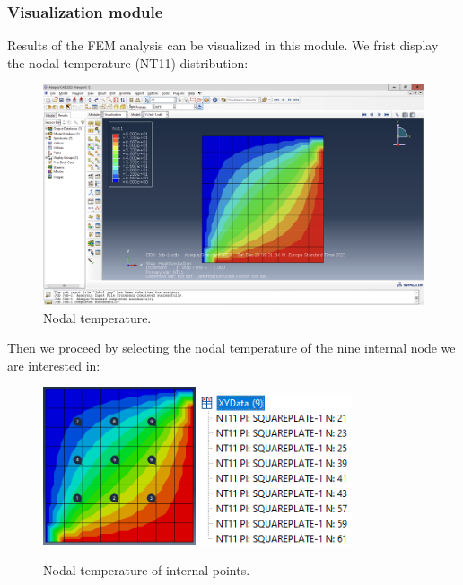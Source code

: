 \newpage

\subsubsection{Visualization module}

Results of the FEM analysis can be visualized in this module. We frist display the nodal temperature (NT11) distribution:
\begin{figure}[H]
    \centering
    \includegraphics[width=\textwidth]{Images/ab2/ab16.png}
    \caption{Nodal temperature.}
    \label{fig:ab16}
\end{figure}

Then we proceed by selecting the nodal temperature of the nine internal node we are interested in:

\begin{figure}[H]
    \centering
    \includegraphics[width=0.4\textwidth]{Images/ab2/ab18.png} \qquad
    \includegraphics[width=0.4\textwidth]{Images/ab2/ab17.png}
    \caption{Nodal temperature of internal points.}
    \label{fig:ab1817}
\end{figure}

